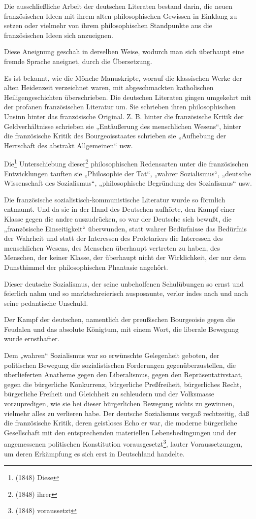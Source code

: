 \documentclass[letterpaper]{article}
\begin{document}
Die ausschließliche Arbeit der deutschen Literaten bestand darin, die neuen französischen Ideen mit ihrem alten philosophischen Gewissen in Einklang zu setzen oder vielmehr von ihrem philosophischen Standpunkte aus die französischen Ideen sich anzueignen.

Diese Aneignung geschah in derselben Weise, wodurch man sich überhaupt eine fremde Sprache aneignet, durch die Übersetzung.

Es ist bekannt, wie die Mönche Manuskripte, worauf die klassischen Werke der alten Heidenzeit verzeichnet waren, mit abgeschmackten katholischen Heiligengeschichten überschrieben. Die deutschen Literaten gingen umgekehrt mit der profanen französischen Literatur um. Sie schrieben ihren philosophischen Unsinn hinter das französische Original. Z. B. hinter die französische Kritik der Geldverhältnisse schrieben sie „Entäußerung des menschlichen Wesens“, hinter die französische Kritik des Bourgeoisstaates schrieben sie „Aufhebung der Herrschaft des abstrakt Allgemeinen“ usw.

Die\footnote{(1848) Diese} Unterschiebung dieser\footnote{(1848) ihrer} philosophischen Redensarten unter die französischen Entwicklungen tauften sie „Philosophie der Tat“, „wahrer Sozialismus“, „deutsche Wissenschaft des Sozialismus“, „philosophische Begründung des Sozialismus“ usw. 

Die französische sozialistisch-kommunistische Literatur wurde so förmlich entmannt. Und da sie in der Hand des Deutschen aufhörte, den Kampf einer Klasse gegen die andre auszudrücken, so war der Deutsche sich bewußt, die „französische Einseitigkeit“ überwunden, statt wahrer Bedürfnisse das Bedürfnis der Wahrheit und statt der Interessen des Proletariers die Interessen des menschlichen Wesens, des Menschen überhaupt vertreten zu haben, des Menschen, der keiner Klasse, der überhaupt nicht der Wirklichkeit, der nur dem Dunsthimmel der philosophischen Phantasie angehört.

Dieser deutsche Sozialismus, der seine unbeholfenen Schulübungen so ernst und feierlich nahm und so marktschreierisch ausposaunte, verlor indes nach und nach seine pedantische Unschuld.

Der Kampf der deutschen, namentlich der preußischen Bourgeoisie gegen die Feudalen und das absolute Königtum, mit einem Wort, die liberale Bewegung wurde ernsthafter.

Dem „wahren“ Sozialismus war so erwünschte Gelegenheit geboten, der politischen Bewegung die sozialistischen Forderungen gegenüberzustellen, die überlieferten Anatheme gegen den Liberalismus, gegen den Repräsentativstaat, gegen die bürgerliche Konkurrenz, bürgerliche Preßfreiheit, bürgerliches Recht, bürgerliche Freiheit und Gleichheit zu schleudern und der Volksmasse vorzupredigen, wie sie bei dieser bürgerlichen Bewegung nichts zu gewinnen, vielmehr alles zu verlieren habe. Der deutsche Sozialismus vergaß rechtzeitig, daß die französische Kritik, deren geistloses Echo er war, die moderne bürgerliche Gesellschaft mit den entsprechenden materiellen Lebensbedingungen und der angemessenen politischen Konstitution vorausgesetzt\footnote{(1848) voraussetzt}, lauter Voraussetzungen, um deren Erkämpfung es sich erst in Deutschland handelte.
\end{document}

